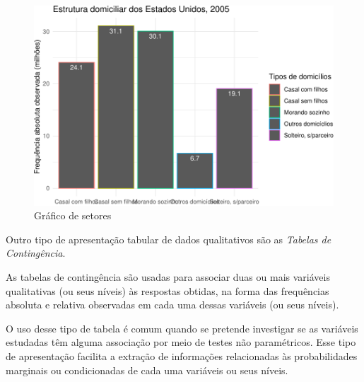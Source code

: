 \documentclass[
]{book}
\begin{document}
\begin{figure}
\centering
\includegraphics{apostila_files/figure-latex/unnamed-chunk-47-1.pdf}
\caption{\label{fig:unnamed-chunk-47}Gráfico de setores}
\end{figure}

\hfill\break

Outro tipo de apresentação tabular de dados qualitativos são as \emph{Tabelas de Contingência}.

\hfill\break

As tabelas de contingência são usadas para associar duas ou mais variáveis qualitativas (ou seus níveis) às respostas obtidas, na forma das frequências absoluta e relativa observadas em cada uma dessas variáveis (ou seus níveis).

\hfill\break

O uso desse tipo de tabela é comum quando se pretende investigar se as variáveis estudadas têm alguma associação por meio de testes não paramétricos. Esse tipo de apresentação facilita a extração de informações relacionadas às probabilidades marginais ou condicionadas de cada uma variáveis ou seus níveis.

\hfill\break
\end{document}
